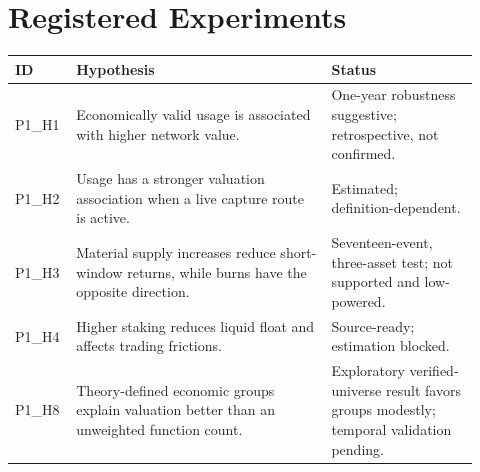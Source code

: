 \documentclass[10pt]{article}
\begin{document}
\section{Registered Experiments}
\begin{longtable}{p{0.10\linewidth}p{0.52\linewidth}p{0.30\linewidth}}
\toprule
ID & Hypothesis & Status \\
\midrule
P1\_H1 & Economically valid usage is associated with higher network value. & One-year robustness suggestive; retrospective, not confirmed. \\
P1\_H2 & Usage has a stronger valuation association when a live capture route is active. & Estimated; definition-dependent. \\
P1\_H3 & Material supply increases reduce short-window returns, while burns have the opposite direction. & Seventeen-event, three-asset test; not supported and low-powered. \\
P1\_H4 & Higher staking reduces liquid float and affects trading frictions. & Source-ready; estimation blocked. \\
P1\_H8 & Theory-defined economic groups explain valuation better than an unweighted function count. & Exploratory verified-universe result favors groups modestly; temporal validation pending. \\
\bottomrule
\end{longtable}
\end{document}
